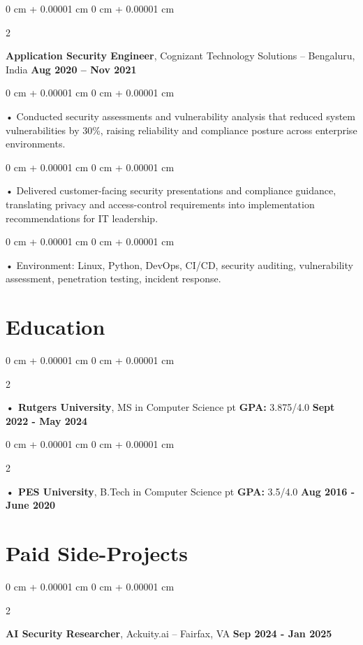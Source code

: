 \documentclass[10pt, letterpaper]{article}
\newenvironment{onecolentry}{
    \begin{adjustwidth}{
        0 cm + 0.00001 cm
    }{
        0 cm + 0.00001 cm
    }
}{
    \end{adjustwidth}
} %
\newenvironment{twocolentry}[2][]{
    \onecolentry
    \def\secondColumn{#2}
    \setcolumnwidth{\fill, 4.5 cm}
    \begin{paracol}{2}
}{
    \switchcolumn \raggedleft \secondColumn
    \end{paracol}
    \endonecolentry
} %
\begin{document}
        \begin{twocolentry}{
            \textbf{Aug 2020 – Nov 2021}
        }
            \vspace{2 pt }
            \textbf{Application Security Engineer}, Cognizant Technology Solutions -- Bengaluru, India\end{twocolentry}
        \begin{onecolentry}
             • Conducted security assessments and vulnerability analysis that reduced system vulnerabilities by 30\%, raising reliability and compliance posture across enterprise environments.
        \end{onecolentry}
        \begin{onecolentry}
             • Delivered customer-facing security presentations and compliance guidance, translating privacy and access-control requirements into implementation recommendations for IT leadership.
        \end{onecolentry}
        \begin{onecolentry}
             • Environment: Linux, Python, DevOps, CI/CD, security auditing, vulnerability assessment, penetration testing, incident response.
        \end{onecolentry}
    \vspace{2 pt }
        \section{Education}
        \vspace{2 pt }
        \begin{twocolentry}{
            \textbf{Sept 2022 - May 2024}
        }
            \textbf{ • Rutgers University}, MS in Computer Science  pt \textbf{GPA:} 3.875/4.0  \end{twocolentry}

        \begin{twocolentry}{
            \textbf{Aug 2016 - June 2020}
        }
            \textbf{ • PES University}, B.Tech in Computer Science  pt \textbf{GPA:} 3.5/4.0  \end{twocolentry}

    \vspace{0.4cm}
    \section{Paid Side-Projects}
            \vspace{2 pt }
                    \begin{twocolentry}{
            \textbf{Sep 2024 - Jan 2025}
        }
            \textbf{AI Security Researcher}, Ackuity.ai -- Fairfax, VA\end{twocolentry}
\end{document}
